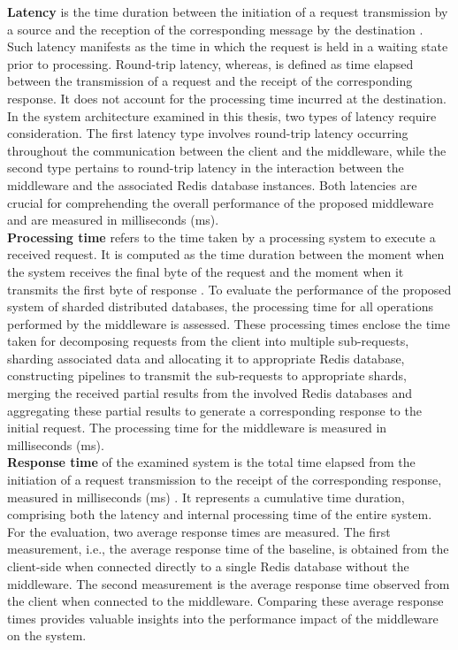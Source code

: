 \textbf{Latency} is the time duration between the initiation of a request transmission by a source and the reception of the corresponding message by the destination \cite{subhlok1996optimal}. Such latency manifests as the time in which the request is held in a waiting state prior to processing. Round-trip latency, whereas, is defined as time elapsed between the transmission of a request and the receipt of the corresponding response. It does not account for the processing time incurred at the destination. In the system architecture examined in this thesis, two types of latency require consideration. The first latency type involves round-trip latency occurring throughout the communication between the client and the middleware, while the second type pertains to round-trip latency in the interaction between the middleware and the associated Redis database instances. Both latencies are crucial for comprehending the overall performance of the proposed middleware and are measured in milliseconds (ms). \\

\noindent \textbf{Processing time} refers to the time taken by a processing system to execute a received request. It is computed as the time duration between the moment when the system receives the final byte of the request and the moment when it transmits the first byte of response \cite{kuzlu2019performance}. To evaluate the performance of the proposed system of sharded distributed databases, the processing time for all operations performed by the middleware is assessed. These processing times enclose the time taken for decomposing requests from the client into multiple sub-requests, sharding associated data and allocating it to appropriate Redis database, constructing pipelines to transmit the sub-requests to appropriate shards, merging the received partial results from the involved Redis databases and aggregating these partial results to generate a corresponding response to the initial request. The processing time for the middleware is measured in milliseconds (ms). \\

\noindent \textbf{Response time} of the examined system is the total time elapsed from the initiation of a request transmission to the receipt of the corresponding response, measured in milliseconds (ms) \cite{kuzlu2019performance, subhlok1996optimal}. It represents a cumulative time duration, comprising both the latency and internal processing time of the entire system. For the evaluation, two average response times are measured. The first measurement, i.e., the average response time of the baseline, is obtained from the client-side when connected directly to a single Redis database without the middleware. The second measurement is the average response time observed from the client when connected to the middleware. Comparing these average response times provides valuable insights into the performance impact of the middleware on the system. \\

